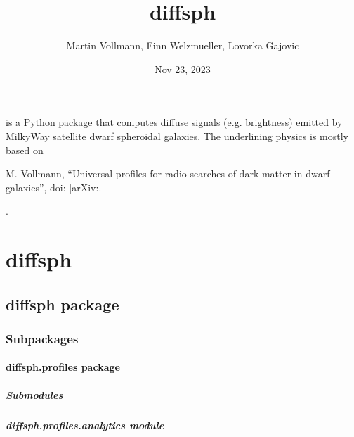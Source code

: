 \documentclass[letterpaper,10pt,english]{sphinxmanual}
\title{diffsph}
\date{Nov 23, 2023}
\author{Martin Vollmann, Finn Welzmueller, Lovorka Gajovic}
\begin{document}
\pagestyle{empty}
\sphinxmaketitle
\pagestyle{plain}
\sphinxtableofcontents
\pagestyle{normal}
\label{\detokenize{index::doc}}


\sphinxAtStartPar
{} is a Python package that computes diffuse signals (e.g. brightness) emitted by Milky\sphinxhyphen{}Way satellite dwarf spheroidal galaxies. The underlining physics is mostly based on %
\begin{footnote}[1]\sphinxAtStartFootnote
M. Vollmann, “Universal profiles for radio searches of dark matter in dwarf galaxies”,
doi:
{[}arXiv:\sphinxhref{https://arxiv.org/abs/2011.11947}{2011.11947 {[}astro\sphinxhyphen{}ph.HE{]}}{]}.
%
\end{footnote}.


\chapter{diffsph}
\label{\detokenize{modules:diffsph}}\label{\detokenize{modules::doc}}

\section{diffsph package}
\label{\detokenize{diffsph:diffsph-package}}\label{\detokenize{diffsph::doc}}

\subsection{Subpackages}
\label{\detokenize{diffsph:subpackages}}

\subsubsection{diffsph.profiles package}
\label{\detokenize{diffsph.profiles:diffsph-profiles-package}}\label{\detokenize{diffsph.profiles::doc}}

\paragraph{Submodules}
\label{\detokenize{diffsph.profiles:submodules}}

\paragraph{diffsph.profiles.analytics module}
\label{\detokenize{diffsph.profiles:module-diffsph.profiles.analytics}}\label{\detokenize{diffsph.profiles:diffsph-profiles-analytics-module}}
\end{document}
